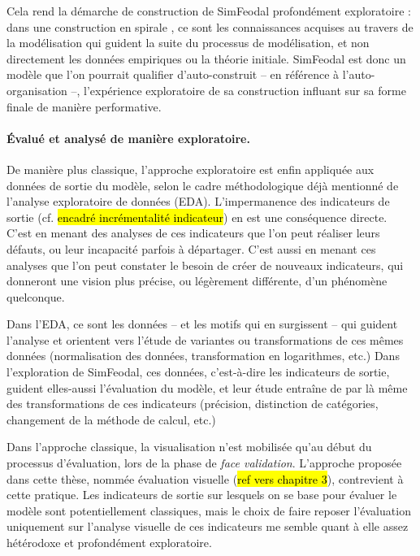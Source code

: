 Cela rend la démarche de construction de SimFeodal profondément exploratoire :
dans une construction \og en spirale\fg{} \autocite[157]{mathian_objets_2014}, ce sont les connaissances acquises au travers de la modélisation qui guident la suite du processus de modélisation, et non directement les données empiriques ou la théorie initiale.
SimFeodal est donc un modèle que l'on pourrait qualifier d'\og auto-construit\fg{} -- en référence à l'auto-organisation --, l'expérience exploratoire de sa construction influant sur sa forme finale de manière performative.

\paragraph{Évalué et analysé de manière exploratoire.}
De manière plus classique, l'approche exploratoire est enfin appliquée aux données de sortie du modèle, selon le cadre méthodologique déjà mentionné de l'analyse exploratoire de données (EDA).
L'impermanence des indicateurs de sortie (cf. \hl{encadré incrémentalité indicateur}) en est une conséquence directe.
C'est en menant des analyses de ces indicateurs que l'on peut réaliser leurs défauts, ou leur incapacité parfois à départager.
C'est aussi en menant ces analyses que l'on peut constater le besoin de créer de nouveaux indicateurs, qui donneront une vision plus précise, ou légèrement différente, d'un phénomène quelconque.

Dans l'EDA, ce sont les données -- et les motifs qui en surgissent -- qui guident l'analyse et orientent vers l'étude de variantes ou transformations de ces mêmes données (normalisation des données, transformation en logarithmes, etc.)
Dans l'exploration de SimFeodal, ces \og données\fg{}, c'est-à-dire les indicateurs de sortie, guident elles-aussi l'évaluation du modèle, et leur étude entraîne de par là même des transformations de ces indicateurs (précision, distinction de catégories, changement de la méthode de calcul, etc.)

Dans l'approche classique, la visualisation n'est mobilisée qu'au début du processus d'évaluation, lors de la phase de \og \textit{face validation}\fg{}.
L'approche proposée dans cette thèse, nommée \og évaluation visuelle\fg{} (\hl{ref vers chapitre 3}), contrevient à cette pratique.
Les indicateurs de sortie sur lesquels on se base pour évaluer le modèle sont potentiellement classiques, mais le choix de faire reposer l'évaluation uniquement sur l'analyse visuelle de ces indicateurs me semble quant à elle assez hétérodoxe et profondément exploratoire.

